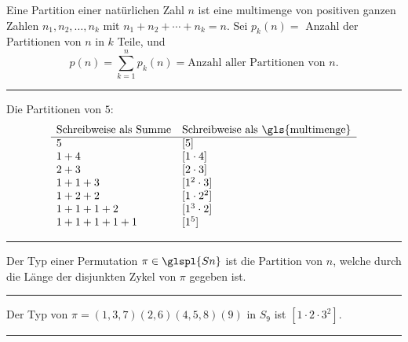 \documentclass[9pt]{article}
\begin{document}
\begin{defi}
Eine Partition einer natürlichen Zahl $n$ ist eine \gls{multimenge} von positiven ganzen Zahlen $n_1, n_2, \dots, n_k$ mit $n_1 + n_2 + \cdots + n_k = n$. Sei $p_k(n) =$ Anzahl der Partitionen von $n$ in $k$ Teile, und  
\[
p(n) = \sum_{k=1}^n p_k(n) = \text{Anzahl aller Partitionen von } n.
\]
\end{defi} \noindent \rule{8cm}{0.4pt}

\begin{bsp}
Die Partitionen von $5$: 
\[
\begin{array}{ll}
\text{Schreibweise als Summe} & \text{Schreibweise als \gls{multimenge}} \\ \hline
5 & [5] \\
1+4 & [1 \cdot 4] \\
2+3 & [2 \cdot 3] \\
1+1+3 & [1^2 \cdot 3] \\
1+2+2 & [1 \cdot 2^2] \\
1+1+1+2 & [1^3 \cdot 2] \\
1+1+1+1+1 & [1^5]
\end{array}
\]
\end{bsp} \noindent \rule{8cm}{0.4pt}

\begin{defi} 
Der Typ einer Permutation $\pi \in \glspl{Sn}$ ist die Partition von $n$, welche durch die Länge der disjunkten Zykel von $\pi$ gegeben ist.
\end{defi} \noindent \rule{8cm}{0.4pt}

\begin{bsp}
Der Typ von $\pi = (1, 3, 7)(2, 6)(4, 5, 8)(9)$ in $S_9$ ist $[1 \cdot 2 \cdot 3^2]$.
\end{bsp} \noindent \rule{8cm}{0.4pt}
\end{document}

